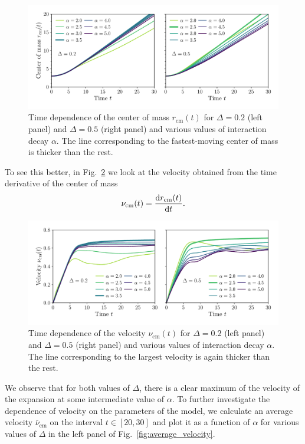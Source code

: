 \begin{figure}[htbp]
  \centering
  \includegraphics[width=\linewidth]{Figures/center_of_mass.pdf}
  \caption{Time dependence of the center of mass \(r_{\text{cm}}(t)\) for \(\Delta = 0.2\) (left panel) and \(\Delta = 0.5\)
  (right panel) and various values of interaction decay \(\alpha\). The line corresponding to the fastest-moving center of mass
  is thicker than the rest.}
  \label{fig:center_of_mass}
\end{figure}

To see this better, in Fig.~\ref{fig:velocity} we look at the velocity
obtained from the time derivative of the center of mass
\begin{equation}
  {\nu}_{\text{cm}}(t) = \dv{r_{\text{cm}}(t)}{t}.
  \label{eq:velocity}
\end{equation}
\begin{figure}[htbp]
  \centering
  \includegraphics[width=\linewidth]{Figures/velocity.pdf}
  \caption{Time dependence of the velocity \(\nu_{\text{cm}}(t)\) for \(\Delta = 0.2\) (left panel) and \(\Delta = 0.5\)
  (right panel) and various values of interaction decay \(\alpha\). The line corresponding to the largest velocity
  is again thicker than the rest.}
  \label{fig:velocity}
\end{figure}
We observe that for both values of \(\Delta\), there is a clear maximum of the velocity of the expansion
at some intermediate value of \(\alpha\). To further investigate the dependence of velocity on the parameters
of the model, we calculate an average velocity \(\bar{\nu}_{\text{cm}}\) on the interval \(t\in\left[20,30\right]\)
and plot it as a function of \(\alpha\) for various values of \(\Delta\) in the left panel of Fig.~\ref{fig:average_velocity}.

